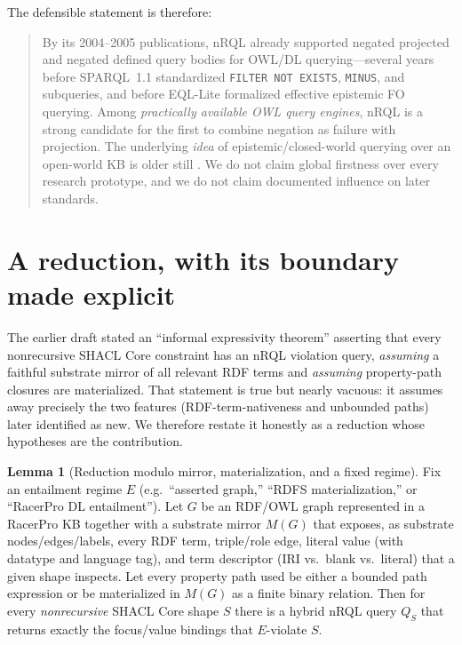 \documentclass[11pt,letterpaper]{article}
\theoremstyle{definition}
\newtheorem{lemma}{Lemma}
\newcommand{\nrql}{nRQL}
\newcommand{\racer}{RacerPro}
\newcommand{\shacl}{SHACL}
\newcommand{\naf}{negation as failure}
\newcommand{\rdf}{RDF}
\newcommand{\owl}{OWL}
\begin{document}
\noindent The defensible statement is therefore:
\begin{quote}
By its 2004--2005 publications, \nrql{} already supported negated projected and negated defined query bodies for \owl{}/DL querying---several years before SPARQL~1.1 standardized \texttt{FILTER NOT EXISTS}, \texttt{MINUS}, and subqueries, and before EQL-Lite formalized effective epistemic FO querying. Among \emph{practically available \owl{} query engines}, \nrql{} is a strong candidate for the first to combine \naf{} with projection. The underlying \emph{idea} of epistemic/closed-world querying over an open-world KB is older still \cite{epistemic,mknf}. We do not claim global firstness over every research prototype, and we do not claim documented influence on later standards.
\end{quote}

\section{A reduction, with its boundary made explicit}\label{sec:reduction}

The earlier draft stated an ``informal expressivity theorem'' asserting that every nonrecursive \shacl{} Core constraint has an \nrql{} violation query, \emph{assuming} a faithful substrate mirror of all relevant \rdf{} terms and \emph{assuming} property-path closures are materialized. That statement is true but nearly vacuous: it assumes away precisely the two features (\rdf{}-term-nativeness and unbounded paths) later identified as new. We therefore restate it honestly as a reduction whose hypotheses are the contribution.

\begin{lemma}[Reduction modulo mirror, materialization, and a fixed regime]\label{lem:reduction}
Fix an entailment regime $E$ (e.g.\ ``asserted graph,'' ``RDFS materialization,'' or ``\racer{} DL entailment''). Let $G$ be an \rdf{}/\owl{} graph represented in a \racer{} KB together with a substrate mirror $M(G)$ that exposes, as substrate nodes/edges/labels, every \rdf{} term, triple/role edge, literal value (with datatype and language tag), and term descriptor (IRI vs.\ blank vs.\ literal) that a given shape inspects. Let every property path used be either a bounded path expression or be materialized in $M(G)$ as a finite binary relation. Then for every \emph{nonrecursive} \shacl{} Core shape $S$ there is a hybrid \nrql{} query $Q_S$ that returns exactly the focus/value bindings that $E$-violate $S$.
\end{lemma}
\end{document}

